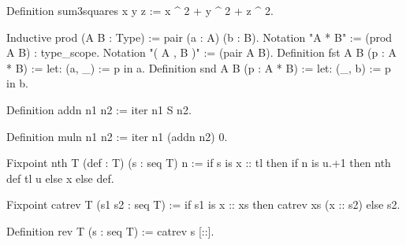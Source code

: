 \begin{Answer}[ref=ex:3sum]
\begin{coq}{}{}
Definition sum3squares x y z := x ^ 2 + y ^ 2 + z ^ 2.
\end{coq}
\end{Answer}

\begin{Answer}[ref=ex:pair]

\begin{coq}{}{}
Inductive prod (A B : Type) := pair (a : A) (b : B).
Notation "A * B" := (prod A B) : type_scope.
Notation "( A , B )" := (pair A B).
Definition fst A B (p : A * B) := let: (a, _) := p in a.
Definition snd A B (p : A * B) := let: (_, b) := p in b.
\end{coq}
\index[coq]{\C{(_ , _)}}

\end{Answer}

\begin{Answer}[ref=ex:iteradd]

\begin{coq}{}{}
Definition addn n1 n2 := iter n1 S n2.
\end{coq}

\end{Answer}

\begin{Answer}[ref=ex:itermul]

\begin{coq}{}{}
Definition muln n1 n2 := iter n1 (addn n2) 0.
\end{coq}

\end{Answer}

\begin{Answer}[ref=ex:nth]

\begin{coq}{}{}
Fixpoint nth T (def : T) (s : seq T) n :=
  if s is x :: tl then if n is u.+1 then nth def tl u else x else def.
\end{coq}

\end{Answer}

\begin{Answer}[ref=ex:rev]

\begin{coq}{}{}
Fixpoint catrev T (s1 s2 : seq T) :=
  if s1 is x :: xs then catrev xs (x :: s2) else s2.

Definition rev T (s : seq T) := catrev s [::].
\end{coq}

\end{Answer}

